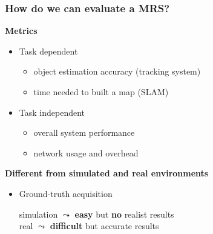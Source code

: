 \begin{frame}
	\frametitle{How do we can evaluate a MRS?}
	
	\textbf{Metrics}
	
	\begin{itemize}
		\item Task dependent
		
		\begin{itemize}
			\normalsize
			
			\item object estimation accuracy (tracking system)
			
			\item time needed to built a map (SLAM)
		\end{itemize}
		
		\item Task independent
		
		\begin{itemize}
			\normalsize
			
			\item overall system performance
			
			\item network usage and overhead
		\end{itemize}
	\end{itemize}
	
	\textbf{Different from simulated and real environments}	
	
	\begin{itemize}
		\normalsize
		
		\item Ground-truth acquisition\\
		
		\vspace{-0.2cm}
		
		\begin{tabbing}
			\hspace*{0.3cm}
			simulation $ \leadsto $ \textbf{easy} but \textbf{no} realist results\\
			
			\hspace*{0.3cm}
			real $ \leadsto $ \textbf{difficult} but accurate results
		\end{tabbing}
	\end{itemize}
\end{frame}

